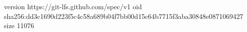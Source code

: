 version https://git-lfs.github.com/spec/v1
oid sha256:dd3c1690d223f5c4c58a689b04f7bb00d15c64b7715f3aba30848e0871069427
size 11076
